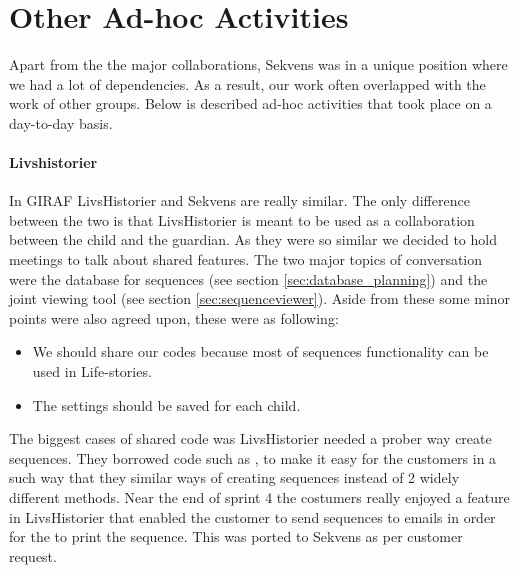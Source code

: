 \section{Other Ad-hoc Activities}\label{sec:adhoc}
Apart from the the major collaborations, Sekvens was in a unique position where we had a lot of dependencies. As a result, our work often overlapped with the work of other groups. Below is described ad-hoc activities that took place on a day-to-day basis.

\paragraph{Livshistorier} 
In GIRAF LivsHistorier and Sekvens are really similar. The only difference between the two is that LivsHistorier is meant to be used as a collaboration between the child and the guardian. As they were so similar we decided to hold meetings to talk about shared features. The two major topics of conversation were the database for sequences (see section \ref{sec:database_planning}) and the joint viewing tool (see section \ref{sec:sequenceviewer}). Aside from these some minor points were also agreed upon, these were as following:

\begin{itemize}
\item We should share our codes because most of sequences functionality can be used in Life-stories.
\item The settings should be saved for each child.
\end{itemize}

The biggest cases of shared code was LivsHistorier needed a prober way create sequences. They borrowed code such as , 
to make it easy for the customers in a such way that they similar ways of creating sequences instead of 2 widely different methods. Near the end of sprint 4 the costumers really enjoyed a feature in LivsHistorier that enabled the customer to send sequences to emails in order for the to print the sequence. This was ported to Sekvens as per customer request.

